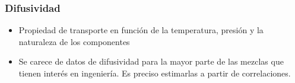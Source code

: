 \subsubsection{Difusividad}
\begin{itemize}
    \item Propiedad de transporte en función de la temperatura, presión
    y la naturaleza de los componentes
    \item Se carece de datos de difusividad para 
    la mayor parte de las mezclas que tienen interés en ingeniería.
    Es preciso estimarlas a partir de correlaciones.
\end{itemize}